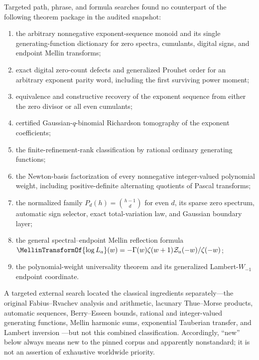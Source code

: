 \documentclass[11pt,oneside]{article}
\numberwithin{equation}{section}
\theoremstyle{definition}
\theoremstyle{remark}
\begin{document}
Targeted path, phrase, and formula searches found no counterpart of the following theorem
package in the audited snapshot:
\begin{enumerate}
\item the arbitrary nonnegative exponent-sequence monoid and its single generating-function
      dictionary for zero spectra, cumulants, digital signs, and endpoint Mellin transforms;
\item exact digital zero-count defects and generalized Prouhet order for an arbitrary
      exponent parity word, including the first surviving power moment;
\item equivalence and constructive recovery of the exponent sequence from either the zero
      divisor or all even cumulants;
\item certified Gaussian-$q$-binomial Richardson tomography of the exponent coefficients;
\item the finite-refinement-rank classification by rational ordinary generating functions;
\item the Newton-basis factorization of every nonnegative integer-valued polynomial weight,
      including positive-definite alternating quotients of Pascal transforms;
\item the normalized family $P_d(h)=\binom{h-1}{d}$ for even $d$, its sparse zero spectrum,
      automatic sign selector, exact total-variation law, and Gaussian boundary layer;
\item the general spectral--endpoint Mellin reflection formula
      $\MellinTransformOf{\log L_a}(w)=-\Gamma(w)\zeta(w+1)\mathcal Z_a(-w)/\zeta(-w)$;
\item the polynomial-weight universality theorem and its generalized Lambert-$W_{-1}$
      endpoint coordinate.
\end{enumerate}

A targeted external search located the classical ingredients separately---the original
Fabius--Rvachev analysis and arithmetic, lacunary Thue--Morse products, automatic sequences,
Berry--Esseen bounds, rational and integer-valued generating functions, Mellin harmonic sums,
exponential Tauberian transfer, and Lambert inversion
\cite{p1:arias1982,p1:arias2017,p1:aistleitner2015,p1:toth2022,p1:alloucheShallit,p1:petrov1995,p1:stanley1997,p1:flajolet1995,p1:debruijn1959,p1:corless1996}---but not this combined classification.
Accordingly, ``new'' below always means new to the pinned corpus and apparently nonstandard;
it is not an assertion of exhaustive worldwide priority.
\end{document}
